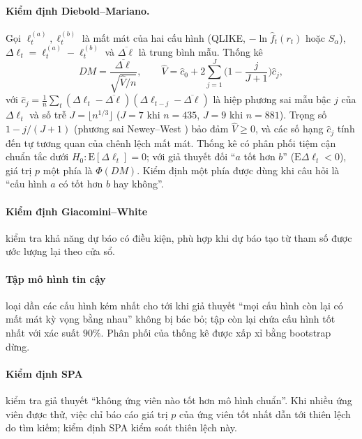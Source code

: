 \documentclass[12pt,a4paper]{article}
\theoremstyle{definition}
\theoremstyle{remark}
\newcommand{\E}{\mathrm{E}}
\begin{document}
\paragraph{Kiểm định Diebold--Mariano.} Gọi $\ell^{(a)}_t,\ell^{(b)}_t$ là mất mát của hai cấu hình (QLIKE, $-\ln\hat f_t(r_t)$ hoặc $S_\alpha$), $\Delta\ell_t=\ell^{(a)}_t-\ell^{(b)}_t$ và $\overline{\Delta\ell}$ là trung bình mẫu. Thống kê \cite{dm1995}
\begin{equation}
DM=\frac{\overline{\Delta\ell}}{\sqrt{\hat V/n}},\qquad
\hat V=\hat c_0+2\sum_{j=1}^{J}\Big(1-\frac{j}{J+1}\Big)\hat c_j ,
\end{equation}
với $\hat c_j=\frac1n\sum_{t}(\Delta\ell_t-\overline{\Delta\ell})(\Delta\ell_{t-j}-\overline{\Delta\ell})$ là hiệp phương sai mẫu bậc $j$ của $\Delta\ell_t$ và số trễ $J=\lfloor n^{1/3}\rfloor$ ($J=7$ khi $n=435$, $J=9$ khi $n=881$). Trọng số $1-j/(J+1)$ (phương sai Newey--West \cite{newey1987}) bảo đảm $\hat V\ge0$, và các số hạng $\hat c_j$ tính đến tự tương quan của chênh lệch mất mát. Thống kê có phân phối tiệm cận chuẩn tắc dưới $H_0:\E[\Delta\ell_t]=0$; với giả thuyết đối ``$a$ tốt hơn $b$'' ($\E\Delta\ell_t<0$), giá trị $p$ một phía là $\Phi(DM)$. Kiểm định một phía được dùng khi câu hỏi là ``cấu hình $a$ có tốt hơn $b$ hay không''.

\paragraph{Kiểm định Giacomini--White} \cite{giacomini2006} kiểm tra khả năng dự báo có điều kiện, phù hợp khi dự báo tạo từ tham số được ước lượng lại theo cửa sổ.

\paragraph{Tập mô hình tin cậy} \cite{hln2011} loại dần các cấu hình kém nhất cho tới khi giả thuyết ``mọi cấu hình còn lại có mất mát kỳ vọng bằng nhau'' không bị bác bỏ; tập còn lại chứa cấu hình tốt nhất với xác suất $90\%$. Phân phối của thống kê được xấp xỉ bằng bootstrap dừng.

\paragraph{Kiểm định SPA} \cite{hansen2005,white2000} kiểm tra giả thuyết ``không ứng viên nào tốt hơn mô hình chuẩn''. Khi nhiều ứng viên được thử, việc chỉ báo cáo giá trị $p$ của ứng viên tốt nhất dẫn tới thiên lệch do tìm kiếm; kiểm định SPA kiểm soát thiên lệch này.
\end{document}
